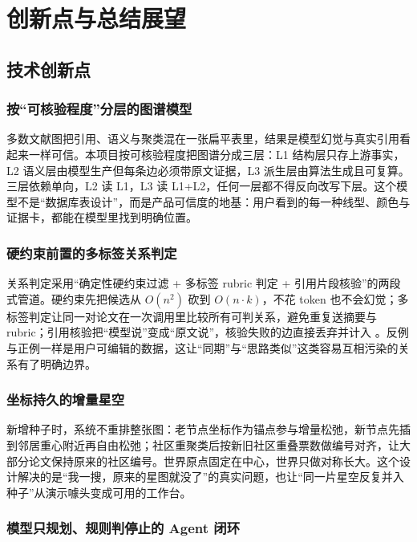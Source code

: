 \section{创新点与总结展望}

\subsection{技术创新点}

\subsubsection{按“可核验程度”分层的图谱模型}

多数文献图把引用、语义与聚类混在一张扁平表里，结果是模型幻觉与真实引用看起来一样可信。本项目按可核验程度把图谱分成三层：L1 结构层只存上游事实，L2 语义层由模型生产但每条边必须带原文证据，L3 派生层由算法生成且可复算。三层依赖单向，L2 读 L1，L3 读 L1+L2，任何一层都不得反向改写下层。这个模型不是“数据库表设计”，而是产品可信度的地基：用户看到的每一种线型、颜色与证据卡，都能在模型里找到明确位置。

\subsubsection{硬约束前置的多标签关系判定}

关系判定采用“确定性硬约束过滤 + 多标签 rubric 判定 + 引用片段核验”的两段式管道。硬约束先把候选从 $O(n^2)$ 砍到 $O(n\cdot k)$，不花 token 也不会幻觉；多标签判定让同一对论文在一次调用里比较所有可判关系，避免重复送摘要与 rubric；引用核验把“模型说”变成“原文说”，核验失败的边直接丢弃并计入 。反例与正例一样是用户可编辑的数据，这让“同期”与“思路类似”这类容易互相污染的关系有了明确边界。

\subsubsection{坐标持久的增量星空}

新增种子时，系统不重排整张图：老节点坐标作为锚点参与增量松弛，新节点先插到邻居重心附近再自由松弛；社区重聚类后按新旧社区重叠票数做编号对齐，让大部分论文保持原来的社区编号。世界原点固定在中心，世界只做对称长大。这个设计解决的是“我一搜，原来的星图就没了”的真实问题，也让“同一片星空反复并入种子”从演示噱头变成可用的工作台。

\subsubsection{模型只规划、规则判停止的 Agent 闭环}

